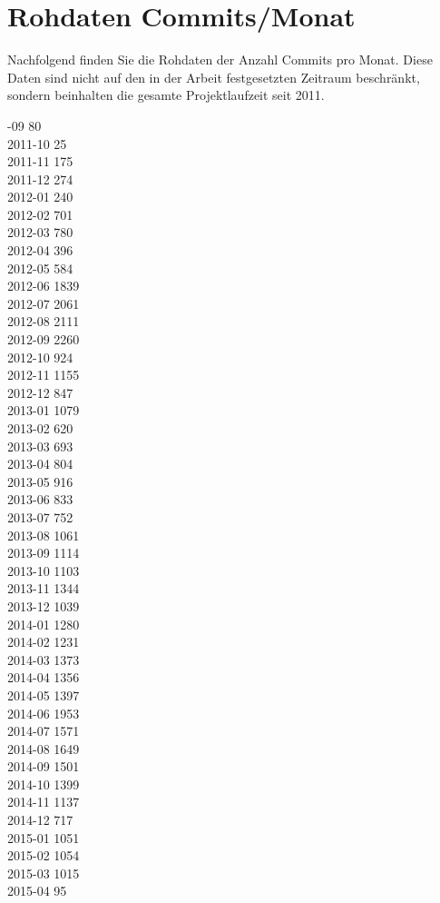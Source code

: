 \section*{Rohdaten Commits/Monat}

Nachfolgend finden Sie die Rohdaten der Anzahl Commits pro Monat. Diese Daten sind nicht auf den in der Arbeit festgesetzten Zeitraum beschränkt, sondern beinhalten die gesamte Projektlaufzeit seit 2011.

-09 80 \\
2011-10 25 \\
2011-11 175 \\
2011-12 274 \\
2012-01 240 \\
2012-02 701 \\
2012-03 780 \\
2012-04 396 \\
2012-05 584 \\
2012-06 1839 \\
2012-07 2061 \\
2012-08 2111 \\
2012-09 2260 \\
2012-10 924 \\
2012-11 1155 \\
2012-12 847 \\
2013-01 1079 \\
2013-02 620 \\
2013-03 693 \\
2013-04 804 \\
2013-05 916 \\
2013-06 833 \\
2013-07 752 \\
2013-08 1061 \\
2013-09 1114 \\
2013-10 1103 \\
2013-11 1344 \\
2013-12 1039 \\
2014-01 1280 \\
2014-02 1231 \\
2014-03 1373 \\
2014-04 1356 \\
2014-05 1397 \\
2014-06 1953 \\
2014-07 1571 \\
2014-08 1649 \\
2014-09 1501 \\
2014-10 1399 \\
2014-11 1137 \\
2014-12 717 \\
2015-01 1051 \\
2015-02 1054 \\
2015-03 1015 \\
2015-04 95 \\

